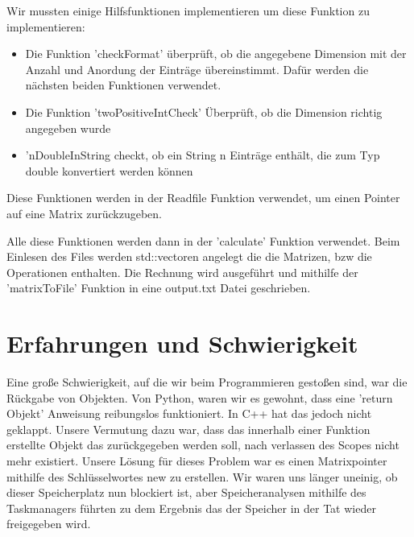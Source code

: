 \documentclass[a4paper]{article}
\begin{document}
\noindent
Wir mussten einige Hilfsfunktionen implementieren um diese Funktion zu implementieren:
\begin{itemize}
	\item Die Funktion 'checkFormat' überprüft, ob die angegebene Dimension mit der Anzahl und Anordung der Einträge übereinstimmt. Dafür werden die nächsten beiden Funktionen verwendet.
	\item Die Funktion 'twoPositiveIntCheck' Überprüft, ob die Dimension richtig angegeben wurde
	\item 'nDoubleInString checkt, ob ein String n Einträge enthält, die zum Typ double konvertiert werden können
\end{itemize}
Diese Funktionen werden in der Readfile Funktion verwendet, um einen Pointer auf eine Matrix zurückzugeben. \newline

\noindent
Alle diese Funktionen werden dann in der 'calculate' Funktion verwendet. Beim Einlesen des Files werden std::vectoren angelegt die die Matrizen, bzw die Operationen enthalten. Die Rechnung wird ausgeführt und mithilfe der 'matrixToFile' Funktion in eine output.txt Datei geschrieben.

\section*{Erfahrungen und Schwierigkeit}

Eine große Schwierigkeit, auf die wir beim Programmieren gestoßen sind, war die Rückgabe von Objekten. Von Python, waren wir es gewohnt, dass eine 'return Objekt' Anweisung reibungslos funktioniert. In C++ hat das jedoch nicht geklappt. Unsere Vermutung dazu war, dass das innerhalb einer Funktion erstellte Objekt das zurückgegeben werden soll, nach verlassen des Scopes nicht mehr existiert. Unsere Lösung für dieses Problem war es einen Matrixpointer mithilfe des Schlüsselwortes new zu erstellen. Wir waren uns länger uneinig, ob dieser Speicherplatz nun blockiert ist, aber Speicheranalysen mithilfe des Taskmanagers führten zu dem Ergebnis das der Speicher in der Tat  wieder freigegeben wird.
\end{document}

